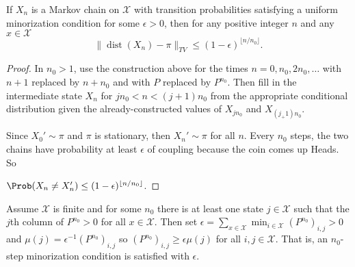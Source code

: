 \documentclass[12pt]{article}
\begin{document}
\begin{theorem}
    If \( X_n \) is a Markov chain on \( \mathcal{X} \) with transition
    probabilities satisfying a uniform minorization condition for some \(
    \epsilon > 0 \), then for any positive integer \( n \) and any \( x
    \in \mathcal{X} \)
    \[
        \|
        \operatorname{dist}
        (X_n) - \pi \|_{TV} \le (1-\epsilon)^{\lfloor n/n_0 \rfloor}.
    \]
\end{theorem}

\begin{proof}
    In \( n_0 > 1 \), use the construction above for the times \( n = 0,
    n_0, 2n_0, \dots \) with \( n+1 \) replaced by \( n + n_0 \) and
    with \( P \) replaced by \( P^{n_0} \).  Then fill in the
    intermediate state \( X_n \) for \( j n_0 < n < (j+1) n_0 \) from
    the appropriate conditional distribution given the
    already-constructed values of \( X_{j n_0} \) and \( X_{(j_+1)n_0} \).

    Since \( X_0' \sim \pi \) and \( \pi \) is stationary, then \( X_n'
    \sim \pi \) for all \( n \).  Every \( n_0 \) steps, the two chains
    have probability at least \( \epsilon \) of coupling because the
    coin comes up Heads.  So

    \( \Prob(X_n \ne X_n') \le (1-\epsilon)^{\lfloor n/n_0 \rfloor} \).
\end{proof}

Assume \( \mathcal{X} \) is finite and for some \( n_0 \) there is at
least one state \( j \in \mathcal{X} \) such that the \( j \)th column
of \( P^{n_0} > 0 \) for all \( x \in \mathcal{X} \).  Then set \(
\epsilon = \sum_{x \in \mathcal{X}} \min_{i \in \mathcal{X}} (P^{n_0})_{i,j}
> 0 \) and \( \mu(j) = \epsilon^{-1} (P^{n_0})_{i,j} \) so \( (P^{n_0})_
{i,j} \ge \epsilon \mu(j) \) for all \( i,j \in \mathcal{X} \).  That
is, an \( n_0 \)-step minorization condition is satisfied with \(
\epsilon \).
\end{document}
